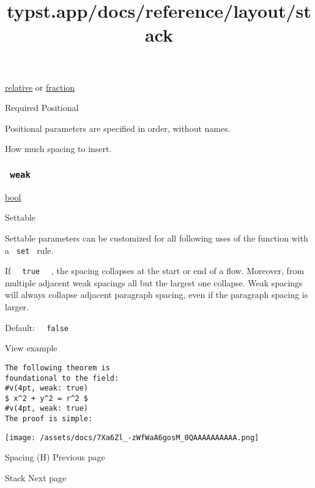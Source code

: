 \href{/docs/reference/layout/relative/}{relative} {or}
\href{/docs/reference/layout/fraction/}{fraction}

{Required} {{ Positional }}

\label{parameters-amount-positional-tooltip}
Positional parameters are specified in order, without names.

How much spacing to insert.

\subsubsection{\texorpdfstring{\texttt{\ weak\ }}{ weak }}\label{parameters-weak}

\href{/docs/reference/foundations/bool/}{bool}

{{ Settable }}

\label{parameters-weak-settable-tooltip}
Settable parameters can be customized for all following uses of the
function with a \texttt{\ set\ } rule.

If \texttt{\ }{\texttt{\ true\ }}\texttt{\ } , the spacing collapses at
the start or end of a flow. Moreover, from multiple adjacent weak
spacings all but the largest one collapse. Weak spacings will always
collapse adjacent paragraph spacing, even if the paragraph spacing is
larger.

Default: \texttt{\ }{\texttt{\ false\ }}\texttt{\ }


View example

\begin{verbatim}
The following theorem is
foundational to the field:
#v(4pt, weak: true)
$ x^2 + y^2 = r^2 $
#v(4pt, weak: true)
The proof is simple:
\end{verbatim}

\texttt{[image: /assets/docs/7Xa6Zl\_-zWfWaA6gosM\_0QAAAAAAAAAA.png]}

\href{/docs/reference/layout/h/}{\pandocbounded{}}

{ Spacing (H) } { Previous page }

\href{/docs/reference/layout/stack/}{\pandocbounded{}}

{ Stack } { Next page }


\title{typst.app/docs/reference/layout/stack}

